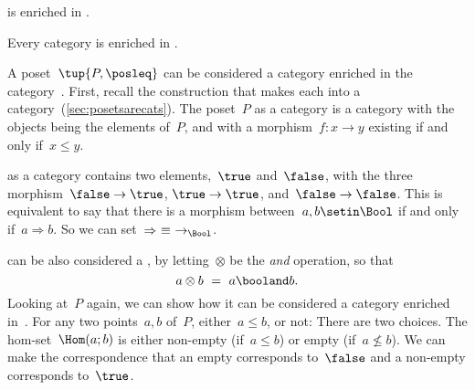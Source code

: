{    \begin{example}
        \Category is enriched in \Category.
    \end{example}

    \begin{example}
        Every category is enriched in \Set.
    \end{example}

    \begin{example}
        A poset~$\tup{P, {\posleq}}$ can be considered a category enriched in the category~\Bool.
        First, recall the construction that makes each  into a category~(\cref{sec:posetsarecats}).
        The poset~$P$ as a category is a category with the objects being the elements of~$P$, and with a morphism~$f\colon x \to y$ existing if and only if~$x\leq y$.

        \Bool as a category contains two elements,~$\true$ and~$\false$, with the three morphism~$\false \to \true$, $\true \to \true$, and~$\false \to \false$.
        This is equivalent to say that there is a morphism between~$a, b \setin \Bool$ if and only if~$a \Rightarrow b$.
        So we can set~$\Rightarrow\ \equiv\ \to_{\Bool}$.

        \Bool can be also considered a , by letting~$\otimes$ be the \emph{and} operation, so that
        \begin{equation}
            a \otimes b\ =\ a \booland b.
        \end{equation}
        Looking at~$P$ again, we can show how it can be considered a category enriched in~\Bool.
        For any two points~$a, b$ of~$P$, either~$a \leq b$, or not: There are two choices.
        The hom-set~$\Hom(a; b)$ is either non-empty (if~$a \leq b$) or empty (if~$a \not\leq b$).
        We can make the correspondence that an empty  corresponds to~$\false$ and a non-empty  corresponds to~$\true$.


\end{example}}
